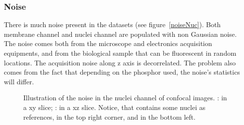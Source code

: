 \subsubsection{Noise}
There is much noise present in the datasets (see figure~\ref{noiseNuc}). Both membrane channel and nuclei channel are populated with non Gaussian noise.
The noise comes both from the microscope and electronics acquisition equipments, and from the biological sample that can be fluorescent in random locations.
The acquisition noise along z axis is decorrelated.
The problem also comes from the fact that depending on the phosphor used, the noise's statistics will differ.
\begin{figure}[htb]
\centering
   \hspace{5pt}
  \caption{%
    Illustration of the noise in the nuclei channel of confocal images.
    : in a xy slice;
    : in a xz slice. 
    Notice, that  contains some nuclei as references, in the top right corner, and  in the bottom left.}
\label{fig:noiseNuc}
\end{figure}


